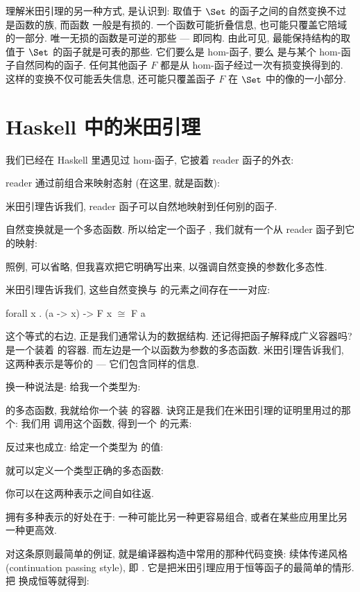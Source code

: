 理解米田引理的另一种方式, 是认识到: 取值于 $\Set$ 的函子之间的自然变换不过是函数的族, 而函数
一般是有损的. 一个函数可能折叠信息, 也可能只覆盖它陪域的一部分. 唯一无损的函数是可逆的那些 ---
即同构. 由此可见, 最能保持结构的取值于 $\Set$ 的函子就是可表的那些. 它们要么是 hom-函子, 要么
是与某个 hom-函子自然同构的函子. 任何其他函子 $F$ 都是从 hom-函子经过一次有损变换得到的.
这样的变换不仅可能丢失信息, 还可能只覆盖函子 $F$ 在 $\Set$ 中的像的一小部分.

\section{Haskell 中的米田引理}

我们已经在 Haskell 里遇见过 hom-函子, 它披着 reader 函子的外衣:

reader 通过前组合来映射态射 (在这里, 就是函数):

米田引理告诉我们, reader 函子可以自然地映射到任何别的函子.

自然变换就是一个多态函数. 所以给定一个函子 , 我们就有一个从 reader 函子到它的映射:

照例,  可以省略, 但我喜欢把它明确写出来, 以强调自然变换的参数化多态性.

米田引理告诉我们, 这些自然变换与  的元素之间存在一一对应:

\begin{snipv}
forall x . (a -> x) -> F x \ensuremath{\cong} F a
\end{snipv}
这个等式的右边, 正是我们通常认为的数据结构. 还记得把函子解释成广义容器吗?  是一个装着
 的容器. 而左边是一个以函数为参数的多态函数. 米田引理告诉我们, 这两种表示是等价的 ---
它们包含同样的信息.

换一种说法是: 给我一个类型为:

的多态函数, 我就给你一个装  的容器. 诀窍正是我们在米田引理的证明里用过的那个: 我们用
 调用这个函数, 得到一个  的元素:

反过来也成立: 给定一个类型为  的值:

就可以定义一个类型正确的多态函数:

你可以在这两种表示之间自如往返.

拥有多种表示的好处在于: 一种可能比另一种更容易组合, 或者在某些应用里比另一种更高效.

对这条原则最简单的例证, 就是编译器构造中常用的那种代码变换: 续体传递风格
(continuation passing style), 即 .
它是把米田引理应用于恒等函子的最简单的情形. 把  换成恒等就得到:

